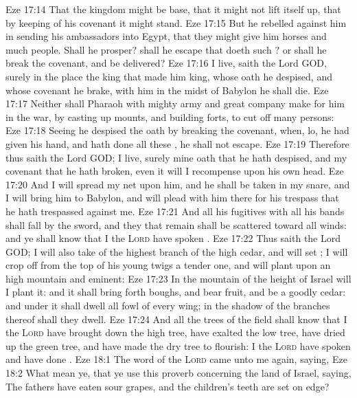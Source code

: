 \vs Eze 17:14 That the kingdom might be base, that it might not lift itself up,  that by keeping of his covenant it might stand.
\vs Eze 17:15 But he rebelled against him in sending his ambassadors into Egypt, that they might give him horses and much people. Shall he prosper? shall he escape that doeth such ? or shall he break the covenant, and be delivered?
\vs Eze 17:16  I live, saith the Lord GOD, surely in the place  the king  that made him king, whose oath he despised, and whose covenant he brake,  with him in the midst of Babylon he shall die.
\vs Eze 17:17 Neither shall Pharaoh with  mighty army and great company make for him in the war, by casting up mounts, and building forts, to cut off many persons:
\vs Eze 17:18 Seeing he despised the oath by breaking the covenant, when, lo, he had given his hand, and hath done all these , he shall not escape.
\vs Eze 17:19 Therefore thus saith the Lord GOD;  I live, surely mine oath that he hath despised, and my covenant that he hath broken, even it will I recompense upon his own head.
\vs Eze 17:20 And I will spread my net upon him, and he shall be taken in my snare, and I will bring him to Babylon, and will plead with him there for his trespass that he hath trespassed against me.
\vs Eze 17:21 And all his fugitives with all his bands shall fall by the sword, and they that remain shall be scattered toward all winds: and ye shall know that I the \textsc{Lord} have spoken .
\vs Eze 17:22 Thus saith the Lord GOD; I will also take of the highest branch of the high cedar, and will set ; I will crop off from the top of his young twigs a tender one, and will plant  upon an high mountain and eminent:
\vs Eze 17:23 In the mountain of the height of Israel will I plant it: and it shall bring forth boughs, and bear fruit, and be a goodly cedar: and under it shall dwell all fowl of every wing; in the shadow of the branches thereof shall they dwell.
\vs Eze 17:24 And all the trees of the field shall know that I the \textsc{Lord} have brought down the high tree, have exalted the low tree, have dried up the green tree, and have made the dry tree to flourish: I the \textsc{Lord} have spoken and have done .
\vs Eze 18:1 The word of the \textsc{Lord} came unto me again, saying,
\vs Eze 18:2 What mean ye, that ye use this proverb concerning the land of Israel, saying, The fathers have eaten sour grapes, and the children's teeth are set on edge?
